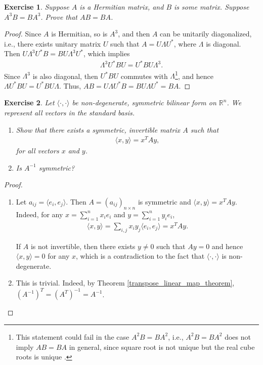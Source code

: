 \documentclass[11pt]{book}
\newtheorem{exercise}{Exercise}[section]
\theoremstyle{definition}
\numberwithin{equation}{chapter}
\begin{document}
\medskip

\begin{exercise}
Suppose $A$ is a Hermitian matrix, and $B$ is some matrix. Suppose $A^3B = BA^3$. Prove that $AB = BA$.
\end{exercise}
\begin{proof}
Since $A$ is Hermitian, so is $A^3$, and then $A$ can be unitarily diagonalized, i.e., there exists unitary matrix $U$ such that $A = U \Lambda U^*$, where $\Lambda$ is diagonal. Then $U \Lambda^3 U^*B = B U \Lambda^3 U^*$, which implies
\begin{align*}
    \Lambda^3 U^*B U = U^* B U \Lambda^3.
\end{align*}
Since $\Lambda^3$ is also diagonal, then $U^*B U$ commutes with $\Lambda$\footnote{This statement could fail in the case $A^2B = BA^2$, i.e., $A^2 B = B A^2$ does not imply $AB = BA$ in general, since square root is not unique but the real cube roots is unique {\rm \cite{41}}.}, and hence $\Lambda U^*B U = U^* B U \Lambda$. Thus, $AB = U \Lambda U^*B = B U \Lambda U^* = BA$.
\end{proof}

\medskip

\begin{exercise}
Let $\big\langle \cdot, \cdot\big\rangle$ be non-degenerate, symmetric bilinear form on $\mathbb{R}^n$. We represent all vectors in the standard basis.
\begin{enumerate}[label=(\alph*)]
    \item Show that there exists a symmetric, invertible matrix $A$ such that 
    \begin{align*}
        \big\langle x, y\big\rangle = x^T Ay,
    \end{align*}
    for all vectors $x$ and $y$.
    
    \item Is $A^{-1}$ symmetric?
\end{enumerate}
\end{exercise}
\begin{proof}
~\begin{enumerate}[label=(\alph*)]
    \item Let $a_{ij} = \big\langle e_i, e_j\big\rangle$. Then $A = \left(a_{ij}\right)_{n \times n}$ is symmetric and $\big\langle x, y\big\rangle = x^T Ay$. Indeed, for any $x = \sum^n_{i=1} x_i e_i$ and $y = \sum^n_{i=1} y_i e_i$,
    \begin{align*}
        \big\langle x, y\big\rangle = \sum_{i,j} x_i y_j \big\langle e_i, e_j\big\rangle = x^T Ay.
    \end{align*}
    
    If $A$ is not invertible, then there exists $y \neq 0$ such that $Ay = 0$ and hence $\big\langle x, y\big\rangle = 0$ for any $x$, which is a contradiction to the fact that $\big\langle \cdot, \cdot\big\rangle$ is non-degenerate.
    
    \item This is trivial. Indeed, by Theorem \ref{transpose_linear_map_theorem}, $\left(A^{-1}\right)^T = \left(A^T\right)^{-1} = A^{-1}$.
\end{enumerate}
\end{proof}
\end{document}
